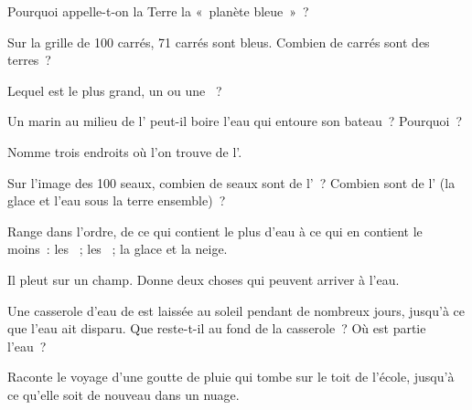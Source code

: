 \begin{exercise}[$\star$]\label{exo:g2:water-on-earth:2}
Pourquoi appelle-t-on la Terre la «~planète bleue~»~?
\end{exercise}

\begin{exercise}[$\star$]\label{exo:g2:water-on-earth:3}
Sur la grille de 100 carrés, 71 carrés sont bleus. Combien de carrés sont
des terres~?
\end{exercise}

\begin{exercise}[$\star$]\label{exo:g2:water-on-earth:4}
Lequel est le plus grand, un  ou une ~?
\end{exercise}

\begin{exercise}[$\star$]\label{exo:g2:water-on-earth:5}
Un marin au milieu de l' peut-il boire l'eau qui entoure son
bateau~? Pourquoi~?
\end{exercise}

\begin{exercise}[$\star$]\label{exo:g2:water-on-earth:6}
Nomme trois endroits où l'on trouve de l'.
\end{exercise}

\begin{exercise}[$\star\star$]\label{exo:g2:water-on-earth:7}
Sur l'image des 100 seaux, combien de seaux sont de l'~? Combien
sont de l' (la glace et l'eau sous la terre ensemble)~?
\end{exercise}

\begin{exercise}[$\star\star$]\label{exo:g2:water-on-earth:8}
Range dans l'ordre, de ce qui contient le plus d'eau à ce qui en contient
le moins~: les ~; les ~; la glace et la neige.
\end{exercise}

\begin{exercise}[$\star\star$]\label{exo:g2:water-on-earth:9}
Il pleut sur un champ. Donne deux choses qui peuvent arriver à l'eau.
\end{exercise}

\begin{exercise}[$\star\star$]\label{exo:g2:water-on-earth:10}
Une casserole d'eau de  est laissée au soleil pendant de nombreux
jours, jusqu'à ce que l'eau ait disparu. Que reste-t-il au fond de la
casserole~? Où est partie l'eau~?
\end{exercise}

\begin{exercise}[$\star\star$]\label{exo:g2:water-on-earth:11}
Raconte le voyage d'une goutte de pluie qui tombe sur le toit de l'école,
jusqu'à ce qu'elle soit de nouveau dans un nuage.
\end{exercise}
